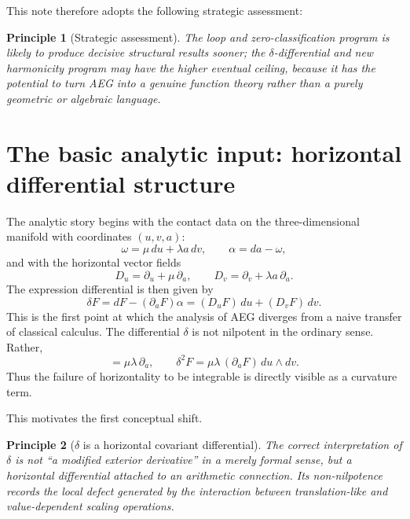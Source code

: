 \documentclass[11pt]{article}
\newtheorem{principle}{Principle}[section]
\newcommand{\AEG}{AEG}
\begin{document}
This note therefore adopts the following strategic assessment:
\begin{principle}[Strategic assessment]
The loop and zero-classification program is likely to produce decisive structural results sooner; the $\delta$-differential and new harmonicity program may have the higher eventual ceiling, because it has the potential to turn \AEG{} into a genuine function theory rather than a purely geometric or algebraic language.
\end{principle}

\section{The basic analytic input: horizontal differential structure}

The analytic story begins with the contact data on the three-dimensional manifold with coordinates $(u,v,a)$:
\begin{equation}
\omega = \mu\,du + \lambda a\,dv,
\qquad
\alpha = da - \omega,
\end{equation}
and with the horizontal vector fields
\begin{equation}
D_u = \partial_u + \mu\,\partial_a,
\qquad
D_v = \partial_v + \lambda a\,\partial_a.
\end{equation}
The expression differential is then given by
\begin{equation}
\delta F = dF - (\partial_a F)\alpha = (D_uF)\,du + (D_vF)\,dv.
\end{equation}
This is the first point at which the analysis of \AEG{} diverges from a naive transfer of classical calculus. The differential $\delta$ is not nilpotent in the ordinary sense. Rather,
\begin{equation}
[D_u,D_v] = \mu\lambda\,\partial_a,
\qquad
\delta^2 F = \mu\lambda\,(\partial_a F)\,du \wedge dv.
\end{equation}
Thus the failure of horizontality to be integrable is directly visible as a curvature term.

This motivates the first conceptual shift.
\begin{principle}[$\delta$ is a horizontal covariant differential]
The correct interpretation of $\delta$ is not ``a modified exterior derivative'' in a merely formal sense, but a horizontal differential attached to an arithmetic connection. Its non-nilpotence records the local defect generated by the interaction between translation-like and value-dependent scaling operations.
\end{principle}
\end{document}
